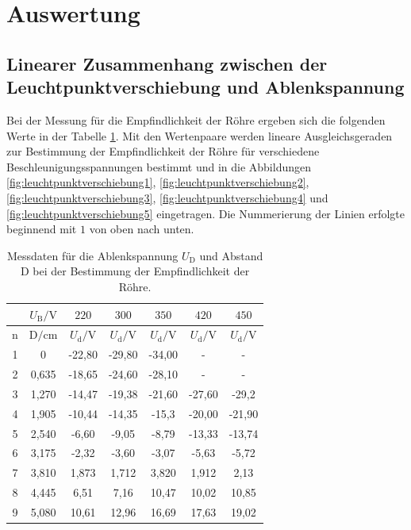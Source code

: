 \section{Auswertung}
\label{sec:Auswertung}

\subsection{Linearer Zusammenhang zwischen der Leuchtpunktverschiebung und Ablenkspannung}
\label{sec:Leuchtpunktverschiebung}

Bei der Messung für die Empfindlichkeit der Röhre ergeben sich die folgenden Werte in der Tabelle \ref{tab:Leuchtpunktverschiebung}. Mit den Wertenpaare werden  lineare Ausgleichsgeraden zur Bestimmung der Empfindlichkeit der Röhre für verschiedene Beschleunigungsspannungen bestimmt und in die Abbildungen \ref{fig:leuchtpunktverschiebung1}, \ref{fig:leuchtpunktverschiebung2}, \ref{fig:leuchtpunktverschiebung3}, \ref{fig:leuchtpunktverschiebung4} und \ref{fig:leuchtpunktverschiebung5} eingetragen. Die Nummerierung der Linien erfolgte beginnend mit $1$ von oben nach unten.

\begin{table}[htbp]
	\centering
	\caption{Messdaten für die Ablenkspannung $U_{\text{D}}$ und Abstand $\text{D}$ bei der Bestimmung der Empfindlichkeit der Röhre.}
	\label{tab:Leuchtpunktverschiebung}
	\begin{tabular}{c c c c c c c}
		\toprule
	    & $U_{\text{B}} / \si{\volt} $ & $220$ & $300$ & $350$ & $420$ & $450$ \\
		\midrule
		n & $\text{D} / \si{\cm}$ & $U_{\text{d}} / \si{\volt} $ & $U_{\text{d}} / \si{\volt} $ & $U_{\text{d}} / \si{\volt} $ & $U_{\text{d}} / \si{\volt} $ & $U_{\text{d}} / \si{\volt} $ \\
		\midrule
		1 & 0 & -22,80 & -29,80 & -34,00 & - & - \\ 
		2 & 0,635 & -18,65 & -24,60 & -28,10 &  - & - \\
		3 & 1,270 & -14,47 & -19,38 & -21,60 & -27,60 & -29,2 \\
		4 & 1,905 & -10,44 & -14,35 & -15,3 & -20,00 & -21,90 \\
		5 & 2,540 & -6,60 & -9,05 & -8,79 & -13,33 & -13,74 \\
		6 & 3,175 & -2,32 & -3,60 & -3,07 & -5,63 & -5,72 \\
		7 & 3,810 & 1,873 & 1,712 & 3,820 & 1,912 & 2,13 \\
 		8 & 4,445 & 6,51 & 7,16 & 10,47 & 10,02 & 10,85 \\
		9 & 5,080 & 10,61 & 12,96 & 16,69 & 17,63 & 19,02 \\
		\bottomrule
		\end{tabular}
	\end{table}

